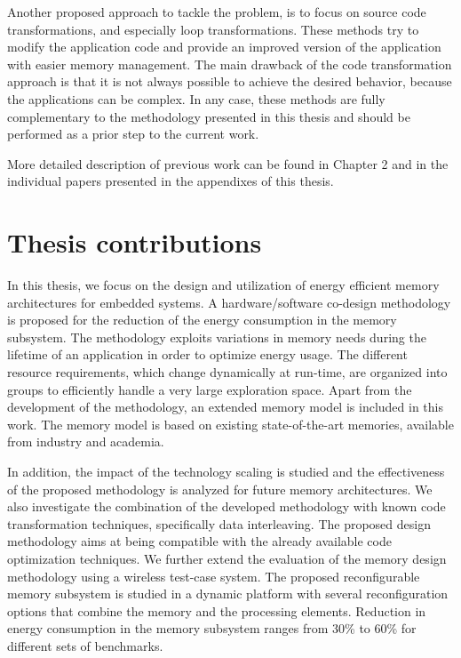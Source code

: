 Another proposed approach to tackle the problem, is to focus on source code transformations, and especially loop transformations.
These methods try to modify the application code and provide an improved version of the application with easier memory management.
The main drawback of the code transformation approach is that it is not always possible to achieve the desired behavior, because the applications can be complex.
In any case, these methods are fully complementary to the methodology presented in this thesis and should be performed as a prior step to the current work. 

More detailed description of previous work can be found in Chapter 2 and in the individual papers presented in the appendixes of this thesis.

\section{Thesis contributions}

In this thesis, we focus on the design and utilization of energy efficient memory architectures for embedded systems.
A hardware/software co-design methodology is proposed for the reduction of the energy consumption in the memory subsystem. 
The  methodology exploits variations in memory needs during the lifetime of an application in order to optimize energy usage. 
The different resource requirements, which change dynamically at run-time, are organized into groups to efficiently handle a very large exploration space.
Apart from the development of the methodology, an extended memory model is included in this work. 
The memory model is based on existing state-of-the-art memories, available from industry and academia.

In addition, the impact of the technology scaling is studied and the effectiveness of the proposed methodology is analyzed for future memory architectures.
We also investigate the combination of the developed methodology with known code transformation techniques, specifically data interleaving.
The proposed design methodology aims at being compatible with the already available code optimization techniques.
We further extend the evaluation of the memory design methodology using a wireless test-case system.
The proposed reconfigurable memory subsystem is studied in a dynamic platform with several reconfiguration options that combine the memory and the processing elements.
Reduction in energy consumption in the memory subsystem ranges from 30\% to 60\% for different sets of benchmarks.

